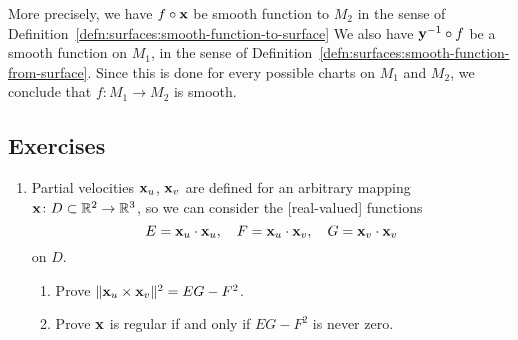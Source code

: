 More precisely, we have $f\circ\mathbf{x}$ be smooth function to $M_{2}$
in the sense of Definition~\ref{defn:surfaces:smooth-function-to-surface}
We also have $\mathbf{y}^{-1}\circ f$ be a smooth function on $M_{1}$, in
the sense of Definition~\ref{defn:surfaces:smooth-function-from-surface}.
Since this is done for every possible charts on $M_{1}$ and $M_{2}$, we
conclude that $f\colon M_{1}\to M_{2}$ is smooth.


\subsection*{Exercises}



\begin{enumerate}
\item Partial velocities $\mathbf{x}_{u}$, $\mathbf{x}_{v}$ are defined for
  an arbitrary mapping $\mathbf{x}\colon D\subset\mathbb{R}^{2}\to\mathbb{R}^{3}$, so
  we can consider the [real-valued] functions
  \begin{equation}
E=\mathbf{x}_{u}\cdot\mathbf{x}_{u},\quad
F=\mathbf{x}_{u}\cdot\mathbf{x}_{v},\quad
G=\mathbf{x}_{v}\cdot\mathbf{x}_{v}
  \end{equation}
  on $D$.
\begin{enumerate}
\item Prove $\|\mathbf{x}_{u}\times\mathbf{x}_{v}\|^{2} = EG-F^{2}$.
\item Prove $\mathbf{x}$ is regular if and only if $EG-F^{2}$ is never zero.
\end{enumerate}
\end{enumerate}

